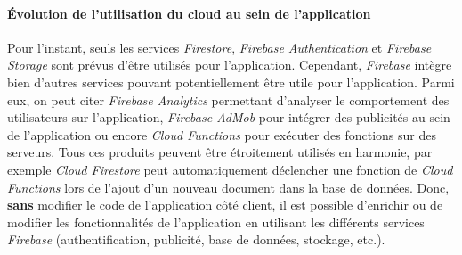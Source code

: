 \paragraph{Évolution de l'utilisation du cloud au sein de l'application}
Pour l'instant, seuls les services \textit{Firestore}, \textit{Firebase Authentication} et \textit{Firebase Storage} sont prévus d'être utilisés pour l'application. Cependant, \textit{Firebase} intègre bien d'autres services pouvant potentiellement être utile pour l'application. Parmi eux, on peut citer \textit{Firebase Analytics} permettant d'analyser le comportement des utilisateurs sur l'application, \textit{Firebase AdMob} pour intégrer des publicités au sein de l'application ou encore \textit{Cloud Functions} pour exécuter des fonctions sur des serveurs. Tous ces produits peuvent être étroitement utilisés en harmonie, par exemple \textit{Cloud Firestore} peut automatiquement déclencher une fonction de \textit{Cloud Functions} lors de l'ajout d'un nouveau document dans la base de données. Donc, \textbf{sans} modifier le code de l'application côté client, il est possible d'enrichir ou de modifier les fonctionnalités de l'application en utilisant les différents services \textit{Firebase} (authentification, publicité, base de données, stockage, etc.).
